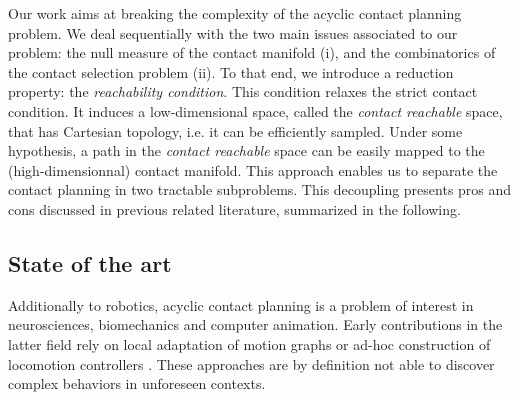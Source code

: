 Our work aims at breaking the complexity of the acyclic contact planning problem.  
We deal sequentially with the two main issues associated to our problem: the null measure of the contact manifold (i), and the combinatorics of the contact selection problem (ii). 
To that end, we introduce a reduction property: the \textit{reachability condition}.
This condition relaxes the strict contact condition.
It induces a low-dimensional space, called the \textit{contact reachable} space, that has Cartesian topology, i.e. it can be efficiently sampled.
Under some hypothesis, a path in the \textit{contact reachable} space can be easily mapped to the (high-dimensionnal) contact manifold. 
This approach enables us to separate the contact planning in two tractable subproblems.
This decoupling presents pros and cons discussed in previous related literature, summarized in the following.




\subsection{State of the art}



Additionally to robotics, acyclic contact planning is a problem of interest in neurosciences, biomechanics and computer animation.
Early contributions in the latter field rely on local adaptation of motion graphs \citep{citeulike:220163} or ad-hoc construction of locomotion controllers \citep{Pettre:2003:LPD:846276.846313}. These approaches are by definition not able to discover complex behaviors in unforeseen contexts.

